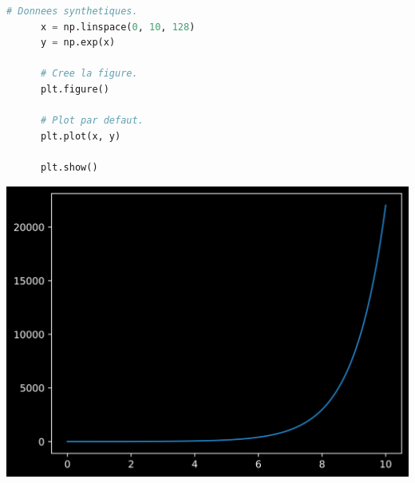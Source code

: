 \documentclass[aspectratio=169]{beamer}
\begin{document}
\begin{frame}[fragile]{}{}
  \vfill
  \begin{minipage}{.48\textwidth}
    \begin{lstlisting}[language=Python]
      # Donnees synthetiques.
      x = np.linspace(0, 10, 128)
      y = np.exp(x)

      # Cree la figure.
      plt.figure()

      # Plot par defaut.
      plt.plot(x, y)

      plt.show()
    \end{lstlisting}
  \end{minipage}%
  \hfill
  \begin{minipage}{.48\textwidth}
    \centering
    \includegraphics[width=\textwidth]{scale_line_plot_default}
  \end{minipage}
  \vfill
\end{frame}
\end{document}

